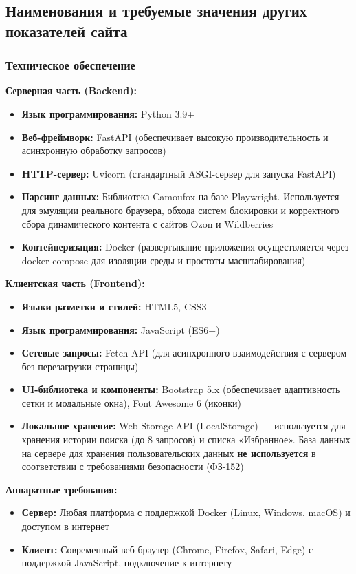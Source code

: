 \documentclass[a4paper,12pt]{article}
\begin{document}
\subsection{Наименования и требуемые значения других показателей сайта}

\subsubsection{Техническое обеспечение}
\textbf{Серверная часть (Backend):}
\begin{itemize}
	\item \textbf{Язык программирования:} Python 3.9+
	\item \textbf{Веб-фреймворк:} FastAPI (обеспечивает высокую производительность и асинхронную обработку запросов)
	\item \textbf{HTTP-сервер:} Uvicorn (стандартный ASGI-сервер для запуска FastAPI)
	\item \textbf{Парсинг данных:} Библиотека Camoufox на базе Playwright. Используется для эмуляции реального браузера, обхода систем блокировки и корректного сбора динамического контента с сайтов Ozon и Wildberries
	\item \textbf{Контейнеризация:} Docker (развертывание приложения осуществляется через docker-compose для изоляции среды и простоты масштабирования)
\end{itemize}

\textbf{Клиентская часть (Frontend):}
\begin{itemize}
	\item \textbf{Языки разметки и стилей:} HTML5, CSS3
	\item \textbf{Язык программирования:} JavaScript (ES6+)
	\item \textbf{Сетевые запросы:} Fetch API (для асинхронного взаимодействия с сервером без перезагрузки страницы)
	\item \textbf{UI-библиотека и компоненты:} Bootstrap 5.x (обеспечивает адаптивность сетки и модальные окна), Font Awesome 6 (иконки)
	\item \textbf{Локальное хранение:} Web Storage API (LocalStorage) — используется для хранения истории поиска (до 8 запросов) и списка «Избранное». База данных на сервере для хранения пользовательских данных \textbf{не используется} в соответствии с требованиями безопасности (ФЗ-152)
\end{itemize}

\textbf{Аппаратные требования:}
\begin{itemize}
	\item \textbf{Сервер:} Любая платформа с поддержкой Docker (Linux, Windows, macOS) и доступом в интернет
	\item \textbf{Клиент:} Современный веб-браузер (Chrome, Firefox, Safari, Edge) с поддержкой JavaScript, подключение к интернету
\end{itemize}
\end{document}

